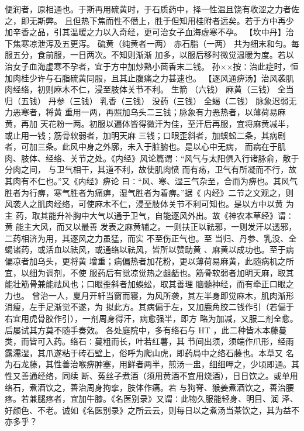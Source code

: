\documentclass[a4paper,12pt,UTF8,twoside]{ctexbook}
\begin{document}
便润者，原相通也。于斯再用硫黄时，于石质药中，择一性温且饶有收涩之力者佐之，即无斯弊。 
且但热下焦而性不僭上，胜于但知用桂附者远矣。若于方中再少 
加辛香之品，引其温暖之力以入奇经，更可治女子血海虚寒不孕。 
【坎中丹】治下焦寒凉泄泻及五更泻。 
硫黄（纯黄者一两） 赤石脂（一两） 
共为细末和匀。每服五分，食前服，一日两次。不知则渐渐 
加多，以服后移时微觉温暖为度。若以治女子血海虚寒不孕者，宜于方中加炒熟小茴香末二钱。 
孙××按∶治此症时，恒加肉桂少许与石脂硫黄同服，且其止腹痛之力甚速也。 
【逐风通痹汤】治风袭肌肉经络，初则麻木不仁，浸至肢体关节不利。 
生箭 （六钱） 麻黄（三钱） 全当归（五钱） 丹参（三钱） 
乳香（三钱） 没药（三钱） 全蝎（二钱） 
脉象迟弱无力恶寒者，将黄 重用一两，再照加乌头二三钱；脉象有力恶热者，以薄荷易麻黄，再加 
天花粉一两。初服以遍体皆得微汗为佳，至汗后再服，宜将麻黄减半，或止用一钱；筋骨软弱者，加明天麻 
三钱；口眼歪斜者，加蜈蚣二条，其病剧者，可加三条。此风中身之外廓，未入于脏腑也。是以心中无病， 
而病在于肌肉、肢体、经络、关节之处。《内经》风论篇谓∶“风气与太阳俱入行诸脉俞，散于分肉之间， 
与卫气相干，其道不利，故使肌肉愤 而有疡，卫气有所凝而不行，故其肉有不仁也。”又《内经》痹论 
曰∶“风、寒、湿三气杂至，合而为痹也。其风气胜者为行痹，寒气胜者为痛痹，湿气胜者为着痹。”据《 
内经》二节之文观之，则风袭人之肌肉经络，可使麻木不仁，浸至肢体关节不利可知也。是以方中以黄 为主 
药，取其能升补胸中大气以通于卫气，自能逐风外出。故《神农本草经》谓∶黄 能主大风，而又以最善 
发表之麻黄辅之。一则扶正以祛邪，一则发汗以透邪，二药相济为用，其逐风之力虽猛，而实 
不至伤正气也。至 
当归、丹参、乳没、全蝎诸药，或活血以祛风，或通络以祛风，皆所以赞助黄 、麻黄以成功也。至于病 
偏凉者加乌头，更将黄 增重；病偏热者加花粉，更以薄荷易麻黄，此随病机之所宜，以细为调剂，不使 
服药后有觉凉觉热之龃龉也。筋骨软弱者加明天麻，取其能壮筋骨兼能祛风也；口眼歪斜者加蜈蚣，取其善理 
脑髓神经，而有牵正口眼之力也。 
曾治一人，夏月开轩当窗而寝，为风所袭，其左半身即觉麻木，肌肉渐形消瘦，左手足渐觉不遂，为 
拟此方。其病偏于左，又加鹿角胶二钱作引（若偏于右宜用虎骨胶作引），一剂周身得汗，病愈强半，即方 
略为加减，又服二剂全愈。后屡试其方莫不随手奏效。 
各处庭院中，多有络石与 HT ，此二种皆木本藤蔓类，而皆可入药。络石∶蔓粗而长，叶若红薯，其 
节间出须，须端作爪形，经雨露濡湿，其爪遂粘于砖石壁上，俗呼为爬山虎，即药局中之络石藤也。本草又 
名为石龙藤，其性善治喉痹肿塞，用鲜者两半，煎汤一盅，细细呷之，少顷即通。其性又善通经络，同续 
断、菟丝子煮酒（须用黄酒不宜用烧酒），日日饮之。或单用络石，煮酒饮之，善治周身拘挛，肢体作痛。若 
与狗脊、猴姜煮酒饮之，善治腰疼。若兼腿疼者，宜加牛膝。《名医别录》又谓∶此物久服能轻身、明目、润 
泽、好颜色、不老。诚如《名医别录》之所云云，则每日以之煮汤当茶饮之，其为益不亦多乎？ 
\end{document}
